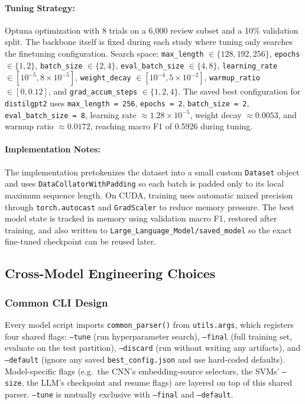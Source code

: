 \documentclass[12pt]{article}
\begin{document}
\paragraph{Tuning Strategy:}
Optuna optimization with 8 trials on a 6,000 review subset and a 10\% validation split. The backbone itself is fixed during each study where  tuning only searches the finetuning configuration. Search space: \texttt{max\_length} $\in \{128, 192, 256\}$, \texttt{epochs} $\in \{1, 2\}$, \texttt{batch\_size} $\in \{2, 4\}$, \texttt{eval\_batch\_size} $\in \{4, 8\}$, \texttt{learning\_rate} $\in [10^{-5}, 8 \times 10^{-5}]$, \texttt{weight\_decay} $\in [10^{-4}, 5 \times 10^{-2}]$, \texttt{warmup\_ratio} $\in [0, 0.12]$, and \texttt{grad\_accum\_steps} $\in \{1, 2, 4\}$. The saved best configuration for \texttt{distilgpt2} uses \texttt{max\_length = 256}, \texttt{epochs = 2}, \texttt{batch\_size = 2}, \texttt{eval\_batch\_size = 8}, learning rate $\approx 1.28 \times 10^{-5}$, weight decay $\approx 0.0053$, and warmup ratio $\approx 0.0172$, reaching macro F1 of 0.5926 during tuning.


\paragraph{Implementation Notes:}
The implementation pretokenizes the dataset into a small custom \texttt{Dataset} object and uses \texttt{DataCollatorWithPadding} so each batch is padded only to its local maximum sequence length. On CUDA, training uses automatic mixed precision through \texttt{torch.autocast} and \texttt{GradScaler} to reduce memory pressure. The best model state is tracked in memory using validation macro F1, restored after training, and also written to \texttt{Large\_Language\_Model/saved\_model} so the exact fine-tuned checkpoint can be reused later.


\subsection{Cross-Model Engineering Choices}

\subsubsection{Common CLI Design}

Every model script imports \texttt{common\_parser()} from \texttt{utils.args}, which registers four shared flags: \texttt{--tune} (run hyperparameter search), \texttt{--final} (full training set, evaluate on the test partition), \texttt{--discard} (run without writing any artifacts), and \texttt{--default} (ignore any saved \texttt{best\_config.json} and use hard-coded defaults). Model-specific flags (e.g.\ the CNN's embedding-source selectors, the SVMs' \texttt{--size}, the LLM's checkpoint and resume flags) are layered on top of this shared parser. \texttt{--tune} is mutually exclusive with \texttt{--final} and \texttt{--default}.
\end{document}
